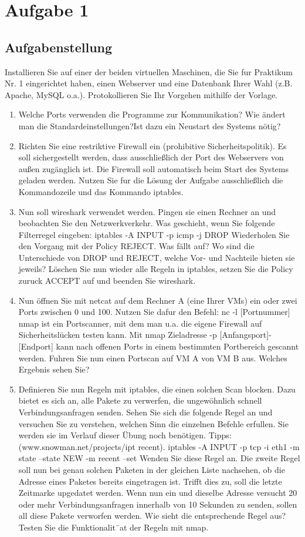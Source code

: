 \newpage
\section{Aufgabe 1}
\subsection{Aufgabenstellung}
Installieren Sie auf einer der beiden virtuellen Maschinen, die Sie fur Praktikum Nr. 1 eingerichtet haben, einen Webserver und eine Datenbank Ihrer Wahl (z.B. Apache, MySQL o.a.). Protokollieren Sie Ihr Vorgehen mithilfe der Vorlage.
\begin{enumerate}[label=(\alph*)]
	\item Welche Ports verwenden die Programme zur Kommunikation? Wie ändert man die Standardeinstellungen?Ist dazu ein Neustart des Systems nötig?
	\item Richten Sie eine restriktive Firewall ein (prohibitive Sicherheitspolitik). Es soll sichergestellt werden, dass ausschließlich der Port des Webservers von außen zugänglich ist. Die Firewall soll automatisch beim Start des Systems geladen werden. Nutzen Sie fur die Lösung der Aufgabe ausschließlich die Kommandozeile und das Kommando iptables.
	\item Nun soll wireshark verwendet werden. Pingen sie einen Rechner an und beobachten Sie den Netzwerkverkehr. Was geschieht, wenn Sie folgende Filterregel eingeben: iptables -A INPUT -p icmp -j DROP Wiederholen Sie den Vorgang mit der Policy REJECT. Was fällt auf? Wo sind die Unterschiede von DROP und REJECT, welche Vor- und Nachteile bieten sie jeweils? Löschen Sie nun wieder alle Regeln in iptables, setzen Sie die Policy zuruck ACCEPT auf und beenden Sie wireshark.
	\item Nun öffnen Sie mit netcat auf dem Rechner A (eine Ihrer VMs) ein oder zwei Ports zwischen 0 und 100. Nutzen Sie dafur den Befehl: nc -l [Portnummer] nmap ist ein Portscanner, mit dem man u.a. die eigene Firewall auf Sicherheitslücken testen kann. Mit nmap Zieladresse -p [Anfangsport]-[Endport] kann nach offenen Ports in einem bestimmten Portbereich gescannt werden. Fuhren Sie nun einen Portscan auf VM A von VM B aus. Welches Ergebnis sehen Sie?
	\item Definieren Sie nun Regeln mit iptables, die einen solchen Scan blocken. Dazu bietet es sich an, alle Pakete zu verwerfen, die ungewöhnlich schnell Verbindungsanfragen senden. Sehen Sie sich die folgende Regel an und versuchen Sie zu verstehen, welchen Sinn die einzelnen Befehle erfullen. Sie werden sie im Verlauf dieser Übung noch benötigen. Tipps: (www.snowman.net/projects/ipt recent). iptables -A INPUT -p tcp -i eth1 -m state --state NEW -m recent --set Wenden Sie diese Regel an. Die zweite Regel soll nun bei genau solchen Paketen in der gleichen Liste nachsehen, ob die Adresse eines Paketes bereits eingetragen ist. Trifft dies zu, soll die letzte Zeitmarke upgedatet werden. Wenn nun ein und dieselbe Adresse versucht 20 oder mehr Verbindungsanfragen innerhalb von 10 Sekunden zu senden, sollen all diese Pakete verworfen werden. Wie sieht die entsprechende Regel aus? Testen Sie die Funktionalit¨at der Regeln mit nmap.

\end{enumerate}
